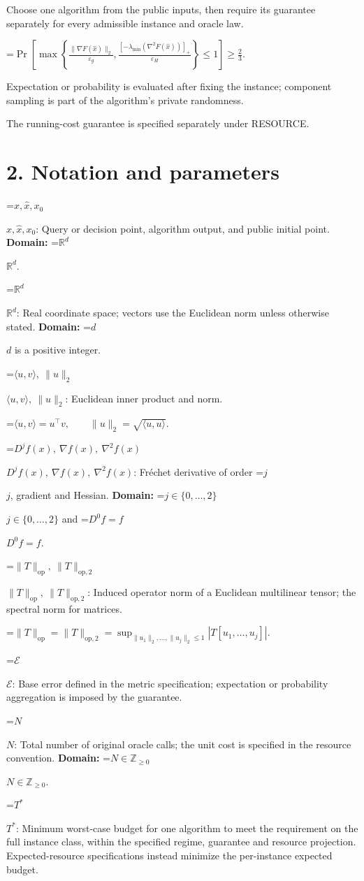 \documentclass[10pt,a4paper]{article}
\newcommand{\AtlasMath}[1]{\par\begingroup\centering\setbox0=\hbox{$\displaystyle #1$}\ifdim\wd0>1.4\linewidth\typeout{ATLAS WIDE FORMULA: \the\wd0}\fi\ifdim\wd0>\linewidth\resizebox{\linewidth}{!}{\box0}\else\box0\fi\par\endgroup}
\newcommand{\AtlasInlineMath}[1]{\begingroup\setbox0=\hbox{$#1$}\ifdim\wd0>.4\linewidth\endgroup\AtlasMath{#1}\else\endgroup$#1$\fi}
\begin{document}
Choose one algorithm from the public inputs, then require its guarantee separately for every admissible instance and oracle law.


\AtlasMath{\Pr\!\left[\max\left\{\frac{\|\nabla F(\widehat{x})\|_2}{\varepsilon_g},\frac{[-\lambda_{\min}(\nabla^2F(\widehat{x}))]_+}{\varepsilon_H}\right\}\le 1\right]\ge\frac23.}


Expectation or probability is evaluated after fixing the instance; component sampling is part of the algorithm's private randomness.

The running-cost guarantee is specified separately under RESOURCE.

\section{2. Notation and parameters}
\AtlasInlineMath{x,\widehat{x},x_0}: Query or decision point, algorithm output, and public initial point. \textbf{Domain:} \AtlasInlineMath{\mathbb{R}^d}.

\AtlasInlineMath{\mathbb{R}^d}: Real coordinate space; vectors use the Euclidean norm unless otherwise stated. \textbf{Domain:} \AtlasInlineMath{d} is a positive integer.

\AtlasInlineMath{\langle u,v\rangle,\ \|u\|_2}: Euclidean inner product and norm.


\AtlasMath{\langle u,v\rangle=u^\top v,\qquad\|u\|_2=\sqrt{\langle u,u\rangle}.}


\AtlasInlineMath{D^jf(x),\ \nabla f(x),\ \nabla^2f(x)}: Fréchet derivative of order \AtlasInlineMath{j}, gradient and Hessian. \textbf{Domain:} \AtlasInlineMath{j\in\{0,\ldots,2\}} and \AtlasInlineMath{D^0f=f}.

\AtlasInlineMath{\|T\|_{\mathrm{op}},\ \|T\|_{\mathrm{op},2}}: Induced operator norm of a Euclidean multilinear tensor; the spectral norm for matrices.


\AtlasMath{\|T\|_{\mathrm{op}}=\|T\|_{\mathrm{op},2}=\sup_{\|u_1\|_2,\ldots,\|u_j\|_2\le1}|T[u_1,\ldots,u_j]|.}


\AtlasInlineMath{\mathcal{E}}: Base error defined in the metric specification; expectation or probability aggregation is imposed by the guarantee.

\AtlasInlineMath{N}: Total number of original oracle calls; the unit cost is specified in the resource convention. \textbf{Domain:} \AtlasInlineMath{N\in\mathbb{Z}_{\ge0}}.

\AtlasInlineMath{T^*}: Minimum worst-case budget for one algorithm to meet the requirement on the full instance class, within the specified regime, guarantee and resource projection. Expected-resource specifications instead minimize the per-instance expected budget.
\end{document}
